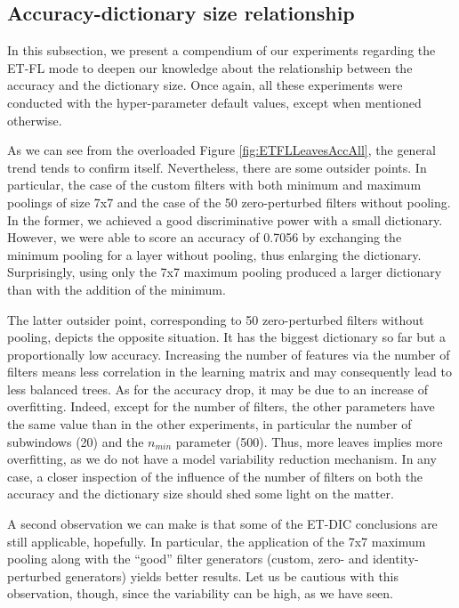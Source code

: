 \documentclass[a4paper]{report}
\newlength{\larg}
\begin{document}
	\subsection{Accuracy-dictionary size relationship}
	In this subsection, we present a compendium of our experiments regarding the ET-FL mode to deepen our knowledge about the relationship between the accuracy and the dictionary size. Once again, all these experiments were conducted with the hyper-parameter default values, except when mentioned otherwise. 
	\par
	As we can see from the overloaded Figure \ref{fig:ETFLLeavesAccAll}, the general trend tends to confirm itself. Nevertheless, there are some outsider points. In particular, the case of the custom filters with both minimum and maximum poolings of size 7x7 and the case of the 50 zero-perturbed filters without pooling. In the former, we achieved a good discriminative power with a small dictionary. However, we were able to score an accuracy of 0.7056 by exchanging the minimum pooling for a layer without pooling, thus enlarging the dictionary. Surprisingly, using only the 7x7 maximum pooling produced a larger dictionary than with the addition of the minimum. 
	\par
	The latter outsider point, corresponding to 50 zero-perturbed filters without pooling, depicts the opposite situation. It has the biggest dictionary so far but a proportionally low accuracy. Increasing the number of features via the number of filters means less correlation in the learning matrix and may consequently lead to less balanced trees. As for the accuracy drop, it may be due to an increase of overfitting. Indeed, except for the number of filters, the other parameters have the same value than in the other experiments, in particular the number of subwindows (20) and the $n_{min}$ parameter (500). Thus, more leaves implies more overfitting, as we do not have a model variability reduction mechanism. In any case, a closer inspection of the influence of the number of filters on both the accuracy and the dictionary size should shed some light on the matter.
	\par
	A second observation we can make is that some of the ET-DIC conclusions are still applicable, hopefully. In particular, the application of the 7x7 maximum pooling along with the ``good'' filter generators (custom, zero- and identity-perturbed generators) yields better results. Let us be cautious with this observation, though, since the variability can be high, as we have seen.
	
\end{document}
